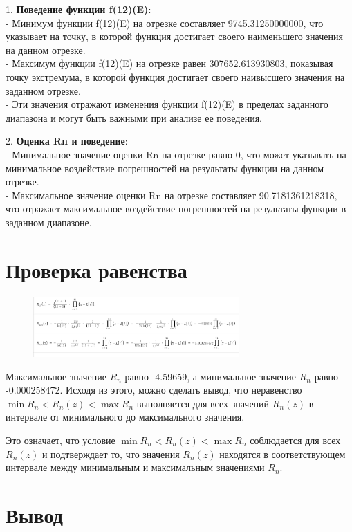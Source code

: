 \documentclass{article}
\begin{document}
\begin{itemize}
1. \textbf{Поведение функции f(12)(E)}: \\
   - Минимум функции f(12)(E) на отрезке составляет 9745.31250000000, что указывает на точку, в которой функция достигает своего наименьшего значения на данном отрезке. \\
   - Максимум функции f(12)(E) на отрезке равен 307652.613930803, показывая точку экстремума, в которой функция достигает своего наивысшего значения на заданном отрезке. \\
   - Эти значения отражают изменения функции f(12)(E) в пределах заданного диапазона и могут быть важными при анализе ее поведения.

2. \textbf{Оценка Rn и поведение}: \\
   - Минимальное значение оценки Rn на отрезке равно 0, что может указывать на минимальное воздействие погрешностей на результаты функции на данном отрезке. \\
   - Максимальное значение оценки Rn на отрезке составляет 90.7181361218318, что отражает максимальное воздействие погрешностей на результаты функции в заданном диапазоне. \\


\section*{Проверка равенства}
\begin{figure}[h]
    \centering
    \includegraphics[width=0.7\textwidth]{lab_2_4.png}
    \label{fig:my_label}
\end{figure}
Максимальное значение $R_n$ равно -4.59659, а минимальное значение $R_n$ равно -0.000258472. Исходя из этого, можно сделать вывод, что неравенство $\min{R_n} < R_n(z) < \max{R_n}$ выполняется для всех значений $R_n(z)$ в интервале от минимального до максимального значения.

Это означает, что условие $\min{R_n} < R_n(z) < \max{R_n}$ соблюдается для всех $R_n(z)$ и подтверждает то, что значения $R_n(z)$ находятся в соответствующем интервале между минимальным и максимальным значениями $R_n$.
\section*{Вывод}


\end{itemize}
\end{document}
